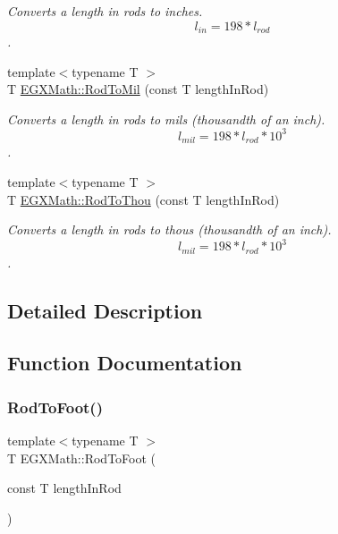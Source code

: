 \begin{DoxyCompactItemize}
\begin{DoxyCompactList}\small\item\em Converts a length in rods to inches. \[ l_{in}= 198 * l_{rod} \]. \end{DoxyCompactList}\item 
{\footnotesize template$<$typename T $>$ }\\T \mbox{\hyperlink{group___e_g_x_math-_conversions-_length_conversions-_surveyors-_rod-_imperial_ga8458f45f5b02b4127d0d5626422b17c3}{E\+G\+X\+Math\+::\+Rod\+To\+Mil}} (const T length\+In\+Rod)
\begin{DoxyCompactList}\small\item\em Converts a length in rods to mils (thousandth of an inch). \[ l_{mil}=198 * l_{rod} * 10^{3} \]. \end{DoxyCompactList}\item 
{\footnotesize template$<$typename T $>$ }\\T \mbox{\hyperlink{group___e_g_x_math-_conversions-_length_conversions-_surveyors-_rod-_imperial_ga1bd077740ba076ebf1e9e99cbeddf6cf}{E\+G\+X\+Math\+::\+Rod\+To\+Thou}} (const T length\+In\+Rod)
\begin{DoxyCompactList}\small\item\em Converts a length in rods to thous (thousandth of an inch). \[ l_{mil}= 198 * l_{rod} * 10^{3} \]. \end{DoxyCompactList}\end{DoxyCompactItemize}


\subsection{Detailed Description}


\subsection{Function Documentation}
\mbox{\label{group___e_g_x_math-_conversions-_length_conversions-_surveyors-_rod-_imperial_ga5d9948f5cfc97d94698be96955a9df7f}} 
\subsubsection{\texorpdfstring{Rod\+To\+Foot()}{RodToFoot()}}
{\footnotesize\ttfamily template$<$typename T $>$ \\
T E\+G\+X\+Math\+::\+Rod\+To\+Foot (\begin{DoxyParamCaption}\item[{const T}]{length\+In\+Rod }\end{DoxyParamCaption})}



